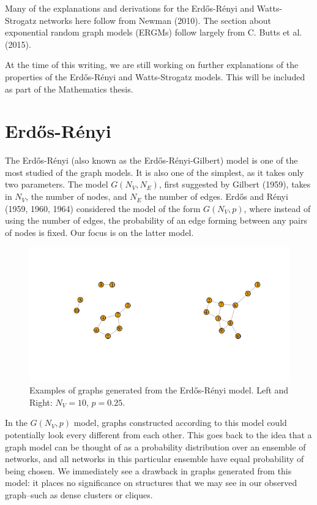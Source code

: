 \documentclass[12pt,twoside]{amherstthesis}
\begin{document}
  Many of the explanations and derivations for the Erdős-Rényi and
  Watts-Strogatz networks here follow from Newman (2010). The section
  about exponential random graph models (ERGMs) follow largely from C.
  Butts et al. (2015).
  
  At the time of this writing, we are still working on further
  explanations of the properties of the Erdős-Rényi and Watts-Strogatz
  models. This will be included as part of the Mathematics thesis.
  
  \section{Erdős-Rényi}\label{erdos-renyi}
  
  The Erdős-Rényi (also known as the Erdős-Rényi-Gilbert) model is one of
  the most studied of the graph models. It is also one of the simplest, as
  it takes only two parameters. The model \(G(N_V, N_E)\), first suggested
  by Gilbert (1959), takes in \(N_V\), the number of nodes, and \(N_E\)
  the number of edges. Erdős and Rényi (1959, 1960, 1964) considered the
  model of the form \(G(N_V, p)\), where instead of using the number of
  edges, the probability of an edge forming between any pairs of nodes is
  fixed. Our focus is on the latter model.
  
  \begin{figure}[htbp]
  \centering
  \includegraphics{figure/21erdosrenyiexample.png}
  \caption{Examples of graphs generated from the Erdős-Rényi model. Left
  and Right: \(N_V = 10\), \(p = 0.25\).}
  \end{figure}
  
  In the \(G(N_V, p)\) model, graphs constructed according to this model
  could potentially look every different from each other. This goes back
  to the idea that a graph model can be thought of as a probability
  distribution over an ensemble of networks, and all networks in this
  particular ensemble have equal probability of being chosen. We
  immediately see a drawback in graphs generated from this model: it
  places no significance on structures that we may see in our observed
  graph--such as dense clusters or cliques.
  
\end{document}

